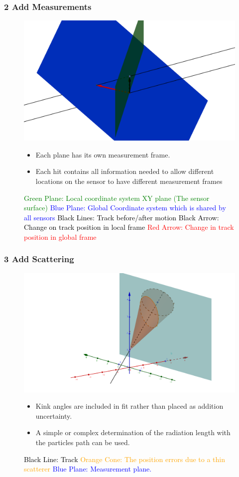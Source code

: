 \documentclass{beamer}
\begin{document}
\begin{frame}
\frametitle{\textbf{2} Add Measurements}
\begin{figure}
\label{Meas}
\includegraphics[width=0.5\linewidth]{pics/prop.png}
\caption{
\tiny{
\textcolor{green}{Green Plane: Local coordinate system XY plane (The sensor surface)}\newline
\textcolor{blue}{Blue Plane: Global Coordinate system which is shared by all sensors}\newline
\textcolor{black}{Black Lines: Track before/after motion}\newline
\textcolor{black}{Black Arrow: Change on track position in local frame}\newline
\textcolor{red}{Red Arrow: Change in track position in global frame}
} 
}
\begin{itemize}
\item Each plane has its own measurement frame.
\item Each hit contains all information needed to allow different locations on the sensor to have different measurement frames
\end{itemize}
\end{figure}
\end{frame}

\begin{frame}
\frametitle{\textbf{3} Add Scattering}
\begin{figure}
\includegraphics[width=0.65\linewidth]{pics/prop600GoodOffSensor.png}
\caption{\tiny{
\textcolor{black}{Black Line: Track}  \textcolor{orange}{Orange Cone: The position errors due to a thin scatterer} \textcolor{blue}{Blue Plane: Measurement plane.} \newline
}
}
\label{fig:ScatFrame}
\begin{itemize}
\item Kink angles are included in fit rather than placed as addition uncertainty. 
\item A simple or complex determination of the radiation length with the particles path can be used.
\end{itemize}
\end{figure}
\end{frame}
\end{document}
